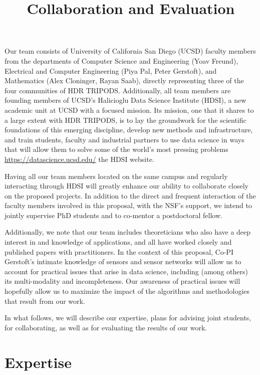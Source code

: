 \documentclass{article}
\title{Collaboration and Evaluation}
\begin{document}
Our team consists of University of California San Diego (UCSD) faculty members from the departments of Computer Science and Engineering (Yoav Freund), Electrical and Computer Engineering (Piya Pal, Peter Gerstoft), and Mathematics (Alex Cloninger, Rayan Saab), directly representing three of the four communities of HDR TRIPODS.  Additionally, all team members are founding members of UCSD's Halicioglu Data Science Institute (HDSI), a new academic unit at UCSD with a focused mission. Its mission, one that it shares to a large extent with HDR TRIPODS, is to lay the groundwork for the scientific foundations of this emerging discipline, develop new methods and infrastructure, and train students, faculty and industrial partners to use data science in ways that will allow them to solve some of the world’s most pressing problems \url{https://datascience.ucsd.edu/}{ the HDSI website}. 

Having all our team members located on the same campus and regularly interacting through HDSI will greatly enhance our ability to collaborate closely on the proposed projects. In addition to the direct and frequent interaction of the faculty members involved in this proposal, with the NSF's support, we intend to jointly supervise PhD students and to co-mentor a postdoctoral fellow. 

Additionally, we note that our team includes theoreticians who also have a deep interest in and knowledge of applications, and all  have worked closely and published papers with practitioners. In the context of this proposal, Co-PI Gerstoft's intimate knowledge of sensors and sensor networks will allow us to account for practical issues that arise in data science, including (among others) its multi-modality and incompleteness. Our awareness of practical issues will hopefully allow us to maximize the impact of the algorithms and methodologies that result from our work.  

In what follows, we will describe our expertise, plans for advising joint students, for collaborating, as well as for evaluating the results of our work.  
 
 \vspace{1cm}
\section{Expertise}
\end{document}
